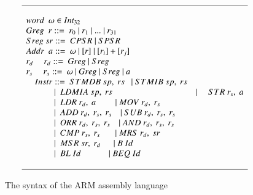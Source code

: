 \documentclass[letterpaper, 10 pt, conference]{IEEEtran}
\begin{document}
\begin{figure}
\begin{displaymath}
\begin{array}{l l l}
\hline\\
word~~\omega \in Int_{32} \\
Greg~~r ::=~r_0~|~r_1~|~...~|~r_{31} \\
Sreg~sr ::=~CPSR~|~SPSR \\
Addr~~a ::=~\omega~|~[r]~|~[r_i]+[r_j] \\
r_d~~~~~r_d ::=~Greg~|~Sreg\\
r_s~~~~~r_s ::=~\omega~|~Greg~|~Sreg~|~a \\
~~~~Instr ::=~STMDB~sp,~rs ~~~|~STMIB~sp,~rs\\
~~~~~~~~~~~~~|~~LDMIA~sp,~rs~~~~&|&~STR~r_s,~a\\
~~~~~~~~~~~~~|~~LDR~r_d,~a~~~~~~~~~ |~MOV~r_d,~r_s\\
~~~~~~~~~~~~~|~~ADD~r_d,~r_s,~r_s~~~~ |~SUB~r_d,~r_s,~r_s\\
~~~~~~~~~~~~~|~~ORR~r_d,~r_s,~r_s~~~~ |~AND~r_d,~r_s,~r_s\\
~~~~~~~~~~~~~|~~CMP ~r_s,~r_s~~~~~~~ |~MRS~r_d,~sr\\
~~~~~~~~~~~~~|~~MSR~sr,~r_d~~~~~~ |~B~Id~\\
~~~~~~~~~~~~~|~~BL~Id~~~~~~~~~~~~~ |~BEQ~Id \\ \\
\hline

\end{array}
\end{displaymath}
\caption{The syntax of the ARM assembly language}
\label{arm-syntax}
\end{figure}
\end{document}
